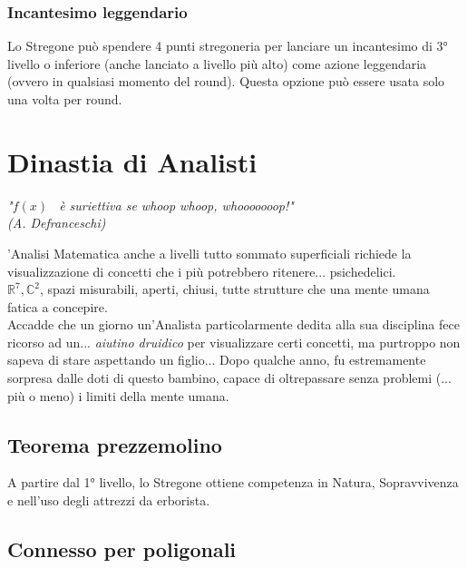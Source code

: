 \subsubsection*{Incantesimo leggendario}

Lo Stregone può spendere 4 punti stregoneria per lanciare un incantesimo di 3° livello o inferiore (anche lanciato a livello più alto) come azione leggendaria (ovvero in qualsiasi momento del round). Questa opzione può essere usata solo una volta per round.

\section{Dinastia di Analisti}

\begin{DndReadAloud}
  \it
  "\begin{math}f(x)\end{math} \ è suriettiva se whoop whoop, whooooooop!" \\ (A. Defranceschi)
\end{DndReadAloud}

'Analisi Matematica anche a livelli tutto sommato superficiali richiede la visualizzazione di concetti che i più potrebbero ritenere... psichedelici. \\ \begin{math} \mathbb{R}^7, \mathbb{C}^2\end{math}, spazi misurabili, aperti, chiusi, tutte strutture che una mente umana fatica a concepire. \\ Accadde che un giorno un'Analista particolarmente dedita alla sua disciplina fece ricorso ad un... \textit{aiutino druidico} per visualizzare certi concetti, ma purtroppo non sapeva di stare aspettando un figlio... Dopo qualche anno, fu estremamente sorpresa dalle doti di questo bambino, capace di oltrepassare senza problemi (... più o meno) i limiti della mente umana.

\subsection{Teorema prezzemolino}

A partire dal 1° livello, lo Stregone ottiene competenza in Natura, Sopravvivenza e nell'uso degli attrezzi da erborista.

\subsection{Connesso per poligonali}

